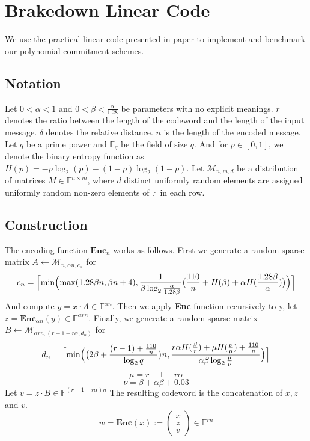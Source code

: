 \chapter{Brakedown Linear Code}

We use the practical linear code presented in paper \cite{brakedown} to implement and benchmark our polynomial commitment schemes.

\section{Notation}

Let $0 < \alpha < 1$ and $0 < \beta < \frac{\alpha}{1.28}$ be parameters with no explicit meanings. $r$ denotes the ratio between the length of the codeword and the length of the input message. $\delta$ denotes the relative distance. $n$ is the length of the encoded message. Let $q$ be a prime power and $\mathbb{F}_q$ be the field of size $q$. And for $p \in [0, 1]$, we denote the binary entropy function as $H(p) = -p\log_2(p) - (1 - p)\log_2(1-p)$. Let $\mathcal{M}_{n, m, d}$ be a distribution of matrices $M \in \mathbb{F}^{n \times m}$, where $d$ distinct uniformly random elements are assigned uniformly random non-zero elements of $\mathbb{F}$ in each row.

\section{Construction}

The encoding function $\textbf{Enc}_n$ works as follows. First we generate a random sparse matrix $A \leftarrow \mathcal{M}_{n, \alpha n, c_n}$ for 
$$
    c_n = \Bigl \lceil \min \Bigl( \max (1.28 \beta n, \beta n + 4), \frac{1}{\beta \log_2 \frac{\alpha}{1.28 \beta}} \bigl( \frac{110}{n} + H(\beta) + \alpha H (\frac{1.28 \beta}{\alpha}) \bigr) \Bigr) \Bigr \rceil
$$
And compute $y = x \cdot A \in \mathbb{F}^{\alpha n}$. Then we apply \textbf{Enc} function recursively to y, let $z = \textbf{Enc}_{\alpha n}(y) \in \mathbb{F}^{\alpha r n}$. Finally, we generate a random sparse matrix $B \leftarrow \mathcal{M}_{\alpha r n, (r - 1 - r \alpha, d_n)}$ for
$$
    d_n = \Bigl \lceil \min \Bigl( \bigl( 2\beta + \frac{(r-1) + \frac{110}{n}}{\log_2 q} \bigr)n, \frac{r \alpha H(\frac{\beta}{r}) + \mu H(\frac{\nu}{\mu}) + \frac{110}{n}}{\alpha \beta \log_2 \frac{\mu}{\nu}} \Bigr) \Bigr \rceil
$$
$$
    \mu = r - 1 - r \alpha
$$
$$
    \nu = \beta + \alpha \beta + 0.03
$$
Let $v = z \cdot B \in \mathbb{F}^{(r - 1 - r\alpha)n}$ The resulting codeword is the concatenation of $x, z$ and $v$.
$$
    w = \textbf{Enc}(x) := \left( \begin{array}{c} x \\ z \\ v \end{array} \right) 
    \in \mathbb{F}^{rn}
$$

